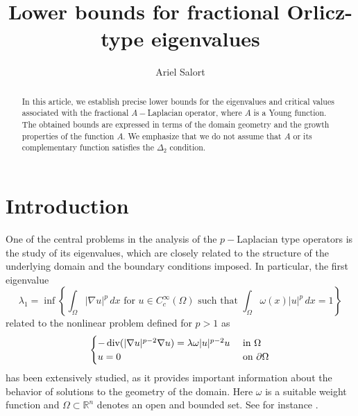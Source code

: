 \documentclass[12pt,reqno]{amsart}
\theoremstyle{definition}
\theoremstyle{remark}
\numberwithin{equation}{section}
\def\diver{\mathop{\text{\normalfont div}}}
\begin{document}
\title{Lower bounds for fractional Orlicz-type eigenvalues	}

\author[ A. Salort]{  Ariel   Salort}
 
\address{A. Salort \newline Departamento de Matem\'aticas y Ciencia de Datos, Universidad San Pablo-CEU, CEU Universities, Urbanizaci\'on Montepr\'incipe, 28660 Boadilla del Monte, Madrid, Spain. }

 
 

\maketitle

\begin{abstract}
In this article, we establish precise lower bounds for the eigenvalues and critical values associated with the fractional $A-$Laplacian operator, where $A$ is a Young function. The obtained bounds are expressed in terms of the domain geometry and the growth properties of the function $A$. We emphasize that we do not assume that $A$ or its complementary function satisfies the $\Delta_2$ condition.
\end{abstract}

\section{Introduction}
One of the central problems in the analysis of the $
p-$Laplacian type operators is the study of its eigenvalues, which are closely related to the structure of the underlying domain and the boundary conditions imposed. In particular, the first eigenvalue 
$$
\lambda_1=\inf\left\{\int_\Omega |\nabla u|^p\,dx \text{ for  } u\in C_c^\infty(\Omega) \text{ such that }\int_\Omega \omega(x)|u|^p \,dx =1\right\}
$$
related to the nonlinear problem defined for $p>1$ as
\begin{align} \label{ec.i1}
\begin{cases}
-\diver(|\nabla u|^{p-2}\nabla u) =\lambda \omega |u|^{p-2}u &\text{ in }\Omega\\ u=0 &\text{ on }\partial\Omega
\end{cases}
\end{align}
has been extensively studied, as it provides important information about the behavior of solutions to the geometry of the domain. Here $\omega$ is a suitable weight function and $\Omega\subset \mathbb{R}^n$ denotes an open and bounded set. See for instance \cite{L1,L2}.
\end{document}
